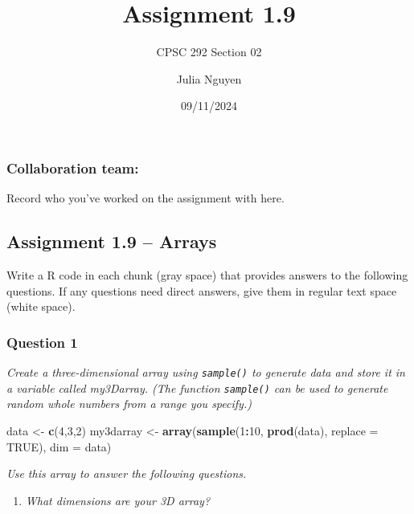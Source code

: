 \documentclass[
]{article}
\title{Assignment 1.9}
\subtitle{CPSC 292 Section 02}
\author{Julia Nguyen}
\date{09/11/2024}
\newenvironment{Shaded}{\begin{snugshade}}{\end{snugshade}}
\newcommand{\AttributeTok}[1]{\textcolor[rgb]{0.13,0.29,0.53}{#1}}
\newcommand{\ConstantTok}[1]{\textcolor[rgb]{0.56,0.35,0.01}{#1}}
\newcommand{\DecValTok}[1]{\textcolor[rgb]{0.00,0.00,0.81}{#1}}
\newcommand{\FunctionTok}[1]{\textcolor[rgb]{0.13,0.29,0.53}{\textbf{#1}}}
\newcommand{\NormalTok}[1]{#1}
\newcommand{\OtherTok}[1]{\textcolor[rgb]{0.56,0.35,0.01}{#1}}
\newcommand{\SpecialCharTok}[1]{\textcolor[rgb]{0.81,0.36,0.00}{\textbf{#1}}}
\providecommand{\tightlist}{%
  \setlength{\itemsep}{0pt}\setlength{\parskip}{0pt}}
\begin{document}
\maketitle

\subsubsection{Collaboration team:}\label{collaboration-team}

Record who you've worked on the assignment with here.

\subsection{Assignment 1.9 -- Arrays}\label{assignment-1.9-arrays}

Write a R code in each chunk (gray space) that provides answers to the
following questions. If any questions need direct answers, give them in
regular text space (white space).

\subsubsection{Question 1}\label{question-1}

\emph{Create a three-dimensional array using \texttt{sample()} to
generate data and store it in a variable called my3Darray. (The function
\texttt{sample()} can be used to generate random whole numbers from a
range you specify.) }

\begin{Shaded}
\begin{Highlighting}[]
\NormalTok{data }\OtherTok{\textless{}{-}} \FunctionTok{c}\NormalTok{(}\DecValTok{4}\NormalTok{,}\DecValTok{3}\NormalTok{,}\DecValTok{2}\NormalTok{)}
\NormalTok{my3darray }\OtherTok{\textless{}{-}} \FunctionTok{array}\NormalTok{(}\FunctionTok{sample}\NormalTok{(}\DecValTok{1}\SpecialCharTok{:}\DecValTok{10}\NormalTok{, }\FunctionTok{prod}\NormalTok{(data), }\AttributeTok{replace =} \ConstantTok{TRUE}\NormalTok{), }\AttributeTok{dim =}\NormalTok{ data)}
\end{Highlighting}
\end{Shaded}

\emph{Use this array to answer the following questions.}

\begin{enumerate}
\def\labelenumi{\alph{enumi}.}
\tightlist
\item
  \emph{What dimensions are your 3D array?}
\end{enumerate}
\end{document}
